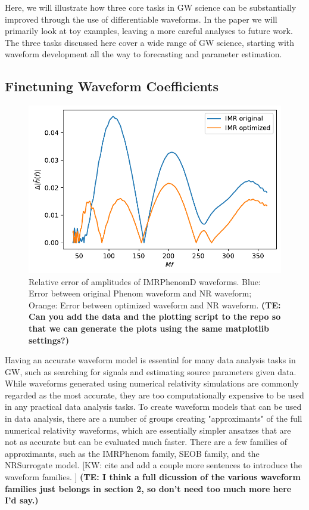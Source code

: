 \documentclass[twocolumn]{aastex631}
\newcommand{\te}[1]{\textbf{\color{pyGreen}(TE: #1)}}
\newcommand{\kw}[1]{{\color{rb4}[KW: #1 ]}}
\begin{document}
Here, we will illustrate how three core tasks in GW science can be substantially improved through the use of differentiable waveforms.
In the paper we will primarily look at toy examples, leaving a more careful analyses to future work. 
The three tasks discussed here cover a wide range of GW science, starting with waveform development all the way to forecasting and parameter estimation.

\subsection{Finetuning Waveform Coefficients}
\label{subsec:coeffs}


\begin{figure}[t!]
    \centering
    \includegraphics[width=\linewidth]{../static/amplitude_loss.pdf}
    \caption{Relative error of amplitudes of IMRPhenomD waveforms. Blue: Error
        between original Phenom waveform and NR waveform; Orange: Error between
        optimized waveform and NR waveform. \te{Can you add the data and the plotting script to the repo so that we can generate the plots using the same matplotlib settings?}}
    \label{fig:loss_compare}
    \end{figure}

Having an accurate waveform model is essential for many data analysis tasks in
GW, such as searching for signals and estimating source parameters given data.
While waveforms generated using numerical relativity simulations are commonly
regarded as the most accurate, they are too computationally expensive to be used
in any practical data analysis tasks. To create waveform models that can be used
in data analysis, there are a number of groups creating "approximants" of the
full numerical relativity waveforms, which are essentially simpler ansatzes that
are not as accurate but can be evaluated much faster. There are a few families
of approximants, such as the IMRPhenom family, SEOB family, and the NRSurrogate
model. \kw{cite and add a couple more sentences to introduce the waveform
families.} \te{I think a full dicussion of the various waveform families just belongs in section 2, so don't need too much more here I'd say.}
\end{document}
